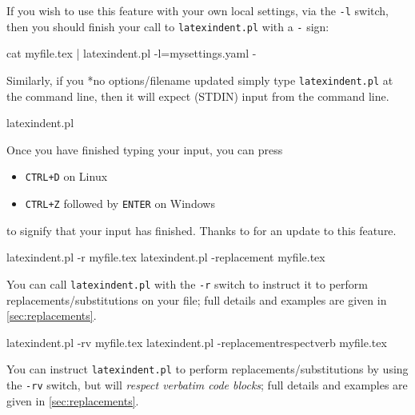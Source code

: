  If you wish to use this feature with your own local settings, via the \texttt{-l}
 switch, then you should finish your call to \texttt{latexindent.pl} with a \texttt{-}
 sign:

 \begin{commandshell}
cat myfile.tex | latexindent.pl -l=mysettings.yaml -
\end{commandshell}

 Similarly, if you *{no options/filename updated} simply type
 \texttt{latexindent.pl} at the command line, then it will expect (STDIN) input from the
 command line.%

 \begin{commandshell}
latexindent.pl
\end{commandshell}

 Once you have finished typing your input, you can press
 \begin{itemize}
  \item \texttt{CTRL+D} on Linux
  \item \texttt{CTRL+Z} followed by \texttt{ENTER} on Windows
 \end{itemize}
 to signify that your input has finished. Thanks to \cite{xu-cheng} for an update to this
 feature.  

 \begin{commandshell}
latexindent.pl -r myfile.tex
latexindent.pl -replacement myfile.tex
\end{commandshell}

 You can  call \texttt{latexindent.pl} with
 the \texttt{-r} switch to instruct it to perform replacements/substitutions on your
 file; full details and examples are given in \vref{sec:replacements}.


 \begin{commandshell}
latexindent.pl -rv myfile.tex
latexindent.pl -replacementrespectverb myfile.tex
\end{commandshell}

 You can  instruct
 \texttt{latexindent.pl} to perform replacements/substitutions by using the \texttt{-rv}
 switch, but will \emph{respect verbatim code blocks}; full details and examples are
 given in \vref{sec:replacements}.%

